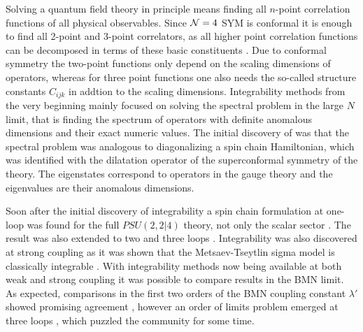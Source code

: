 \vspace{20pt}
\vspace{20pt}

Solving a quantum field theory in principle means finding all $n$-point correlation functions of all physical observables. 
Since $\mathcal{N}=4$ SYM is conformal it is enough to find all 2-point and 3-point correlators, as all higher point correlation functions can be decomposed in terms of these basic constituents \cite{Belavin:1984ab}.
Due to conformal symmetry the two-point functions only depend on the scaling dimensions of operators, whereas for three point functions one also needs the so-called structure constants $C_{ijk}$ in addtion to the scaling dimensions.
Integrability methods from the very beginning mainly focused on solving the spectral problem in the large $N$ limit, that is finding the spectrum of operators with definite anomalous dimensions and their exact numeric values.
The initial discovery of \cite{Minahan:2002ve} was that the spectral problem was analogous to diagonalizing a spin chain Hamiltonian, which was identified with the dilatation operator of the superconformal symmetry of the theory.
The eigenstates correspond to operators in the gauge theory and the eigenvalues are their anomalous dimensions.

Soon after the initial discovery of integrability a spin chain formulation at one-loop was found for the full $PSU(2,2|4)$ theory, not only the scalar sector \cite{Beisert:2003jj}. 
The result was also extended to two and three loops \cite{Beisert:2003tq}. 
Integrability was also discovered at strong coupling as it was shown that the Metsaev-Tseytlin sigma model is classically integrable \cite{Bena:2003wd}. 
With integrability methods now being available at both weak and strong coupling it was possible to compare results in the BMN limit.
As expected, comparisons in the first two orders of the BMN coupling constant $\lambda'$ showed promising agreement \cite{Frolov:2003qc, Frolov:2003xy, Arutyunov:2003uj}, however an order of limits problem emerged at three loops \cite{Beisert:2003tq}, which puzzled the community for some time. 

